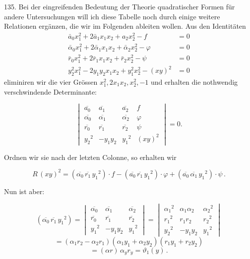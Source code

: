 135.  Bei der eingreifenden Bedeutung der Theorie quadratischer Formen f\"ur andere Untersuchungen will ich diese Tabelle noch durch einige weitere Relationen erg\"anzen, die wir im Folgenden ableiten wollen. Aus den Identit\"aten
\[
\begin{aligned}
\bar a_0 x_1^2 + 2\bar a_1 x_1 x_2 + a_2 x_2^2 - f &= 0 %
\\
\bar\alpha_0 x_1^2 + 2\bar\alpha_1 x_1 x_2 + \bar\alpha_2 x_2^2 - \varphi &= 0\\
\bar r_0 x_1^2 + 2\bar r_1 x_1 x_2 + \bar r_2 x_2^2 - \psi &= 0\\
y_2^2 x_1^2 - 2y_1y_2x_1x_2 + y_1^2x_2^2 - (xy)^2 &= 0
\end{aligned}
\]
eliminiren wir die vier Gr\"ossen $x_1^2, 2x_1x_2, x_2^2, -1$ und erhalten die nothwendig verschwindende Determinante:



\[
\begin{vmatrix}
\overline{a_0} & \overline{a_1} & \overline{a_2} & f \\
\overline{\alpha_0} & \overline{\alpha_1} & \overline{\alpha_2} & \varphi \\
\overline{r_0} & \overline{r_1} & \overline{r_2} & \psi \\
y_2{}^2 & -y_1y_2 & y_1{}^2 & (xy)^2
\end{vmatrix} = 0.
\]

Ordnen wir sie nach der letzten Colonne, so erhalten wir

\[
R\,(xy)^2 = (\overline{\alpha_0}\,\overline{r_1}\,y_1{}^2)\cdot f - (\overline{a_0}\,\overline{r_1}\,y_1{}^2)\cdot\varphi + (\overline{a_0}\,\overline{\alpha_1}\,y_1{}^2)\cdot\psi\,.
\]

Nun ist aber:

\[
(\overline{\alpha_0}\,\overline{r_1}\,y_1{}^2) =
\begin{vmatrix}
\overline{\alpha_0} & \overline{\alpha_1} & \overline{\alpha_2} \\
\overline{r_0} & \overline{r_1} & \overline{r_2} \\
y_1{}^2 & -y_1y_2 & y_1{}^2
\end{vmatrix}
=
\begin{vmatrix}
\alpha_1{}^2 & \alpha_1\alpha_2 & \alpha_2{}^2 \\
r_1{}^2 & r_1r_2 & r_2{}^2 \\
y_2{}^2 & -y_1y_2 & y_1{}^2
\end{vmatrix}
\]
\[
= (\alpha_1 r_2 - \alpha_2 r_1)(\alpha_1 y_1 + \alpha_2 y_2)(r_1 y_1 + r_2 y_2)
\]
\[
= (\alpha r)\,\alpha_y r_y = \vartheta_1(y)\,.
\]

